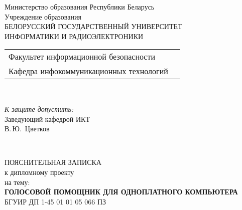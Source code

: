 \begin{titlepage}
	\begin{center}
		Министерство образования Республики Беларусь\\[1em]
		Учреждение образования\\
		БЕЛОРУССКИЙ ГОСУДАРСТВЕННЫЙ УНИВЕРСИТЕТ \\
		ИНФОРМАТИКИ И РАДИОЭЛЕКТРОНИКИ\\[1em]
		
		\begin{minipage}{\textwidth}
			\begin{flushleft}
				\begin{tabular}{ l l }
					Факультет информационной безопасности \\
					Кафедра инфокоммуникационных технологий
				\end{tabular}
			\end{flushleft}
		\end{minipage}\\[1em]
		
		\begin{flushright}
			\begin{minipage}{0.4\textwidth}
				\textit{К защите допустить:}\\[0.8em]
				Заведующий кафедрой ИКТ\\[0.45em]
				\underline{\hspace*{2.8cm}} В.\,Ю.~Цветков
			\end{minipage}\\[2.2em]
		\end{flushright}
		
		{ПОЯСНИТЕЛЬНАЯ ЗАПИСКА}\\
		{к дипломному проекту}\\
		{на тему:}\\[1em]
		\textbf{\large ГОЛОСОВОЙ ПОМОЩНИК ДЛЯ ОДНОПЛАТНОГО КОМПЬЮТЕРА}\\[1em]
		
		
		{БГУИР ДП 1-45 01 01 05 066 ПЗ}\\[2em]
		

\end{center}
\end{titlepage}
